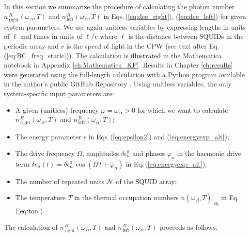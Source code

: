 \noindent
In this section we summarize the procedure of calculating the photon number 
$n_{\,\text{right}}^{\,R}(\omega_{\,\alpha}, T)$ and 
$n_{\,\text{left}}^{\,R}(\omega_{\,\alpha}, T)$ 
in Eqs.\,(\ref{eq:dce_right}), (\ref{eq:dce_left})
for given system parameters. 
We use again unitless variables 
by expressing lengths in units of $\ell$
and times in units of $\ell/v$ where $\ell$ is the distance between SQUIDs in the periodic array
and $v$ is the speed of light in the CPW (see text after Eq.\,(\ref{eq:BC_freq_static})). 
The calculation is illustrated in the Mathematica notebook in Appendix \ref{ch:Mathematica_KP}. Results in Chapter \ref{ch:results} were generated using the full-length calculation with a Python program available in the author's public GitHub Repository \cite{Github_Repository}.
%
Using unitless variables, the only system-specific input parameters are:
%
\begin{itemize}
%
\item A given (unitless) frequency 
$\omega = \omega_{\,\alpha} > 0$ for which we want to calculate 
$n_{\,\text{right}}^{\,R}(\omega_{\,\alpha}, T)$ and 
$n_{\,\text{left}}^{\,R}(\omega_{\,\alpha}, T)$;
%
\item The energy parameter $\epsilon$ in Eqs.\,(\ref{eq:epsilon2}) and (\ref{eq:energyexp_alt});
%
\item The drive frequency $\Omega$, amplitudes $\delta \epsilon_n^0$ and 
phases $\varphi_n$ in the harmonic drive term 
$\delta \epsilon_n(t) = \delta \epsilon_n^0 \, \cos(\Omega \, t + \varphi_n)$
in Eq.\,(\ref{eq:energyexp_alt});

\item The number of repeated units ${\cal N}$ of the SQUID array;

\item The temperature $T$ in the thermal occupation numbers 
$\left. n(\omega_{\,\beta}, T) \right|_{\text{eq}}$ in Eq.\,(\ref{eq:ton}).
%
\end{itemize}

\noindent
The calculation of 
$n_{\,\text{right}}^{\,R}(\omega_{\,\alpha}, T)$ and 
$n_{\,\text{left}}^{\,R}(\omega_{\,\alpha}, T)$ proceeds as follows. 

